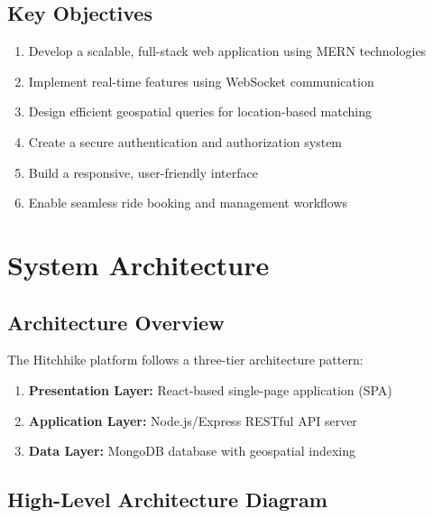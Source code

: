 \documentclass[12pt,a4paper]{article}
\begin{document}
\subsection{Key Objectives}
\begin{enumerate}
    \item Develop a scalable, full-stack web application using MERN technologies
    \item Implement real-time features using WebSocket communication
    \item Design efficient geospatial queries for location-based matching
    \item Create a secure authentication and authorization system
    \item Build a responsive, user-friendly interface
    \item Enable seamless ride booking and management workflows
\end{enumerate}

\newpage

\section{System Architecture}

\subsection{Architecture Overview}
The Hitchhike platform follows a three-tier architecture pattern:

\begin{enumerate}
    \item \textbf{Presentation Layer:} React-based single-page application (SPA)
    \item \textbf{Application Layer:} Node.js/Express RESTful API server
    \item \textbf{Data Layer:} MongoDB database with geospatial indexing
\end{enumerate}

\subsection{High-Level Architecture Diagram}
\end{document}
